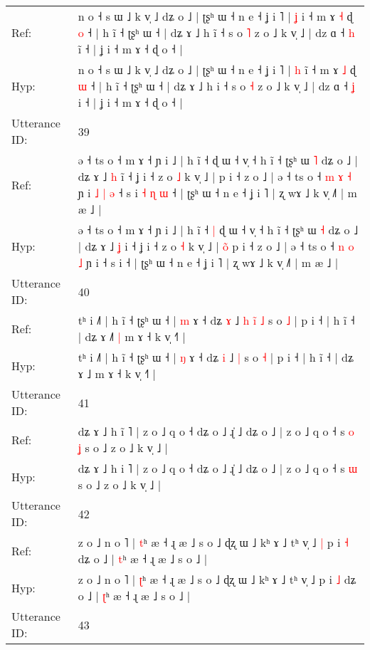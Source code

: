 \documentclass[10pt]{article}
\DeclareRobustCommand{\hl}[1]{{\textcolor{red}{#1}}}
\begin{document}
\begin{longtable}{ll}
Ref: & n o ˧ s ɯ ˩ k v̩ ˩ dʑ o ˩ | ʈʂʰ ɯ ˧ n e ˧ ʝ i ˥ | \hl{ʝ} i\hl{} ˧ m ɤ \hl{˧} ɖ \hl{o} ˧ | h ĩ ˧ ʈʂʰ ɯ ˧ | dʑ ɤ ˩ h i\hl{̃} ˧ s o \hl{˥} z o ˩ k v̩ ˩ | dz ɑ ˧ \hl{h} i\hl{̃} ˧ | ʝ i ˧ m ɤ ˧ ɖ o ˧ |
 \\
Hyp: & n o ˧ s ɯ ˩ k v̩ ˩ dʑ o ˩ | ʈʂʰ ɯ ˧ n e ˧ ʝ i ˥ | \hl{h} i\hl{̃} ˧ m ɤ \hl{˩} ɖ \hl{ɯ} ˧ | h ĩ ˧ ʈʂʰ ɯ ˧ | dʑ ɤ ˩ h i\hl{} ˧ s o \hl{˧} z o ˩ k v̩ ˩ | dz ɑ ˧ \hl{ʝ} i\hl{} ˧ | ʝ i ˧ m ɤ ˧ ɖ o ˧ |
 \\
\midrule
Utterance ID: & 39 \\
Ref: & ə ˧ ts o ˧ m ɤ ˧ ɲ i ˩ | h ĩ ˧\hl{}\hl{} ɖ ɯ ˧ v̩ ˧ h ĩ ˧ ʈʂʰ ɯ \hl{˥} dʑ o ˩ | dʑ ɤ ˩ \hl{h} i\hl{̃} ˧ ʝ i ˧ z o \hl{˩} k v̩ ˩ |\hl{}\hl{}\hl{} p i ˧ z o ˩ | ə ˧ ts o ˧ \hl{m} \hl{ɤ} \hl{˧} ɲ i\hl{ }\hl{˩}\hl{ }\hl{|}\hl{ }\hl{ə} ˧ s i\hl{ }\hl{˧}\hl{ }\hl{ɳ}\hl{ }\hl{ɯ} ˧ | ʈʂʰ ɯ ˧ n e ˧ ʝ i ˥ | ʐ wɤ ˩ k v̩ ˩˥ | m æ ˩ |
 \\
Hyp: & ə ˧ ts o ˧ m ɤ ˧ ɲ i ˩ | h ĩ ˧\hl{ }\hl{|} ɖ ɯ ˧ v̩ ˧ h ĩ ˧ ʈʂʰ ɯ \hl{˧} dʑ o ˩ | dʑ ɤ ˩ \hl{ʝ} i\hl{} ˧ ʝ i ˧ z o \hl{˧} k v̩ ˩ |\hl{ }\hl{o}\hl{̃} p i ˧ z o ˩ | ə ˧ ts o ˧ \hl{n} \hl{o} \hl{˩} ɲ i\hl{}\hl{}\hl{}\hl{}\hl{}\hl{} ˧ s i\hl{}\hl{}\hl{}\hl{}\hl{}\hl{} ˧ | ʈʂʰ ɯ ˧ n e ˧ ʝ i ˥ | ʐ wɤ ˩ k v̩ ˩˥ | m æ ˩ |
 \\
\midrule
Utterance ID: & 40 \\
Ref: & tʰ i ˩˥ | h ĩ ˧ ʈʂʰ ɯ ˧ | \hl{m} ɤ ˧ dʑ \hl{ɤ} ˩\hl{ }\hl{h}\hl{ }\hl{i}\hl{̃} \hl{˩} s o \hl{˩} | p i ˧ | h ĩ ˧ | dʑ ɤ ˩\hl{˥}\hl{ }\hl{|} m ɤ ˧ k v̩ ˧˥ |
 \\
Hyp: & tʰ i ˩˥ | h ĩ ˧ ʈʂʰ ɯ ˧ | \hl{ŋ} ɤ ˧ dʑ \hl{i} ˩\hl{}\hl{}\hl{}\hl{}\hl{} \hl{|} s o \hl{˧} | p i ˧ | h ĩ ˧ | dʑ ɤ ˩\hl{}\hl{}\hl{} m ɤ ˧ k v̩ ˧˥ |
 \\
\midrule
Utterance ID: & 41 \\
Ref: & dʑ ɤ ˩ h i\hl{̃} ˥ | z o ˩ q o ˧ dʑ o ˩ ɻ̍ ˩ dʑ o ˩ | z o ˩ q o ˧ s\hl{ }\hl{o} \hl{ʝ} s o ˩ z o ˩ k v̩ ˩ |
 \\
Hyp: & dʑ ɤ ˩ h i\hl{} ˥ | z o ˩ q o ˧ dʑ o ˩ ɻ̍ ˩ dʑ o ˩ | z o ˩ q o ˧ s\hl{}\hl{} \hl{ɯ} s o ˩ z o ˩ k v̩ ˩ |
 \\
\midrule
Utterance ID: & 42 \\
Ref: & z o ˩ n o ˥ | \hl{t}ʰ æ ˧ ɻ æ ˩ s o ˩ ɖʐ ɯ ˩ kʰ ɤ ˩ tʰ v̩ ˩\hl{ }\hl{|} p i \hl{˧} dʑ o ˩ | \hl{t}ʰ æ ˧ ɻ æ ˩ s o ˩ |
 \\
Hyp: & z o ˩ n o ˥ | \hl{ʈ}ʰ æ ˧ ɻ æ ˩ s o ˩ ɖʐ ɯ ˩ kʰ ɤ ˩ tʰ v̩ ˩\hl{}\hl{} p i \hl{˩} dʑ o ˩ | \hl{ʈ}ʰ æ ˧ ɻ æ ˩ s o ˩ |
 \\
\midrule
Utterance ID: & 43 \\

\end{longtable}
\end{document}
